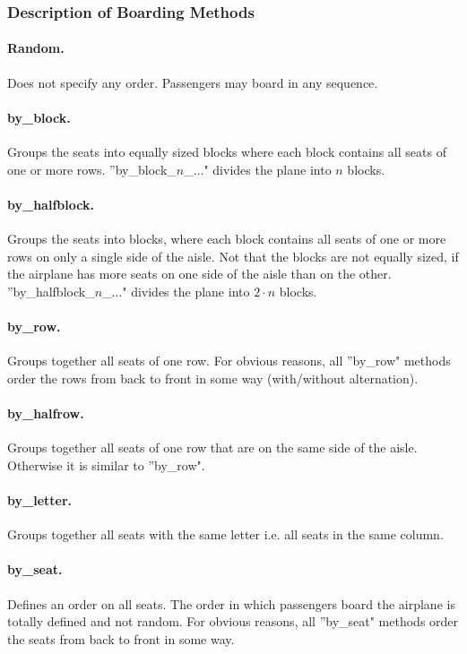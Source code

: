 \documentclass[11pt]{article}
\begin{document}
\subsubsection{Description of Boarding Methods}

\paragraph{Random.} Does not specify any order. Passengers may board in any sequence.
\paragraph{by\_block.} Groups the seats into equally sized blocks where each block contains all seats of one or more rows. ''by\_block\_$n$\_$\dots$" 
divides the plane into $n$ blocks.
\paragraph{by\_halfblock.} Groups the seats into blocks, where each block contains all seats of one or more rows on only a single side of the aisle. Not that the blocks are not equally sized, if the airplane has more seats on one side of the aisle than on the other. ''by\_halfblock\_$n$\_$\dots$" divides the plane into $2\cdot n$ blocks.

\paragraph{by\_row.} Groups together all seats of one row. For obvious reasons, all ''by\_row" methods order the rows from back to front in some way (with/without alternation).

\paragraph{by\_halfrow.} Groups together all seats of one row that are on the same side of the aisle. Otherwise it is similar to ''by\_row".

\paragraph{by\_letter.} Groups together all seats with the same letter i.e. all seats in the same column.

\paragraph{by\_seat.} Defines an order on all seats. The order in which passengers board the airplane is totally defined and not random. For obvious reasons, all ''by\_seat" methods order the seats from back to front in some way.
\end{document}
